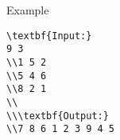 Example
\begin{verbatim}
\textbf{Input:}
9 3
\\1 5 2
\\5 4 6
\\8 2 1
\\
\\\textbf{Output:}
\\7 8 6 1 2 3 9 4 5 \end{verbatim}